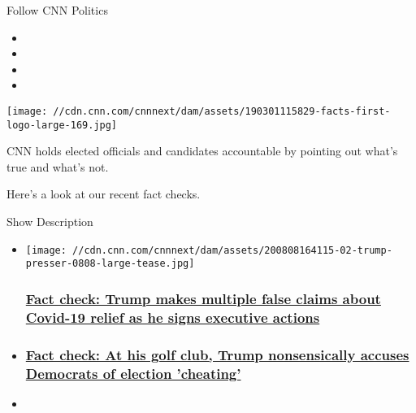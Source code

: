 Follow CNN Politics

\begin{itemize}
\item
\item
\item
\item
\end{itemize}

\texttt{[image: //cdn.cnn.com/cnnnext/dam/assets/190301115829-facts-first-logo-large-169.jpg]}

CNN holds elected officials and candidates accountable by pointing out
what's true and what's not.

Here's a look at our recent fact checks.

Show Description

\begin{itemize}
\item
  \href{/2020/08/08/politics/fact-check-trump-covid-executive-actions-bedminster/index.html}{}

  \texttt{[image: //cdn.cnn.com/cnnnext/dam/assets/200808164115-02-trump-presser-0808-large-tease.jpg]}

  \hypertarget{fact-check-trump-makes-multiple-false-claims-about-covid-19-relief-as-he-signs-executive-actions}{%
  \subsubsection{\texorpdfstring{\href{/2020/08/08/politics/fact-check-trump-covid-executive-actions-bedminster/index.html}{Fact
  check: Trump makes multiple false claims about Covid-19 relief as he
  signs executive
  actions}}{Fact check: Trump makes multiple false claims about Covid-19 relief as he signs executive actions}}\label{fact-check-trump-makes-multiple-false-claims-about-covid-19-relief-as-he-signs-executive-actions}}
\item
  \hypertarget{fact-check-at-his-golf-club-trump-nonsensically-accuses-democrats-of-election-cheating-}{%
  \subsubsection{\texorpdfstring{\href{/2020/08/07/politics/donald-trump-press-briefing-democrats-cheating-election-fact-check/index.html}{Fact
  check: At his golf club, Trump nonsensically accuses Democrats of
  election 'cheating'
  }}{Fact check: At his golf club, Trump nonsensically accuses Democrats of election 'cheating' }}\label{fact-check-at-his-golf-club-trump-nonsensically-accuses-democrats-of-election-cheating-}}
\item
  \hypertarget{fact-check-trump-ad-edits-out-microphone-and-trees-from-biden-photo-to-make-him-seem-alone-in-basement}{%
}
\end{itemize}
